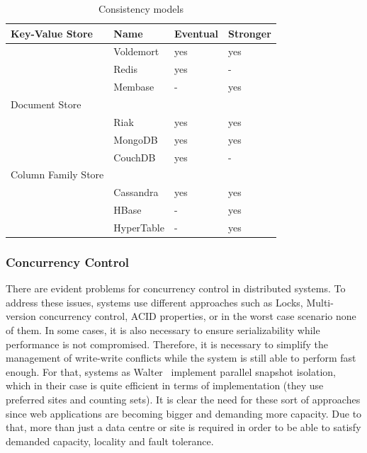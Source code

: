 		\begin{table}[t]
		\begin{center}
    			\begin{tabular}{ | p{5cm} | l | l | l |}
   			\hline
			Key-Value Store & Name & Eventual & Stronger \\ \hline   		
			 & Voldemort & yes & yes\\ \hline
			 & Redis & yes & - \\ \hline
			 & Membase & - & yes\\ \hline
			
			Document Store &  &  & \\ \hline
			 & Riak & yes & yes \\ \hline			
			 & MongoDB & yes & yes \\ \hline
			 & CouchDB & yes & - \\ \hline
			Column Family Store &  &  & \\ \hline
			 & Cassandra & yes & yes \\ \hline
			 & HBase & - & yes \\ \hline
			 & HyperTable & - & yes \\ \hline
    			\end{tabular}
		\end{center}
		\caption{Consistency models}
		\label{table:consistency}
		\end{table}	

	\subsubsection{Concurrency Control}\label{sub-concurrency}
	There are evident problems for concurrency control in distributed systems. To address these issues, systems use different approaches such as Locks, Multi-version concurrency control, ACID properties, or in the worst case scenario none of them. In some cases, it is also necessary to ensure serializability while performance is not compromised. Therefore, it is necessary to simplify the management of write-write conflicts while the system is still able to perform fast enough. For that, systems as Walter~\cite{Sovran:2011} implement parallel snapshot isolation, which in their case is quite efficient in terms of implementation (they use preferred sites and counting sets). It is clear the need for these sort of approaches since web applications are becoming bigger and demanding more capacity. Due to that, more than just a data centre or site is required in order to be able to satisfy demanded capacity, locality and fault tolerance.
	
